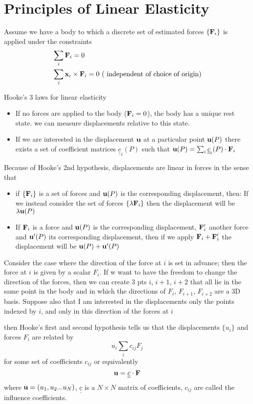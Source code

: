 \documentclass[12pt]{article}
\newcommand{\xx}{{\bf x}}
\newcommand{\uu}{{\bf u}}
\newcommand{\FF}{{\bf F}}
\newcommand{\cc}{{\underline{\underline c}}}
\begin{document}
\section{Principles of Linear Elasticity}
Assume we have a body to which a discrete set of estimated forces $\{\FF_i\}$ is applied under the constraints
\begin{align*}
&\sum_i \FF_i = 0 \\
&\sum_i \xx_i\times \FF_i = 0 \text{ ( independent of choice of origin)}
\end{align*}

Hooke's 3 laws for linear elasticity
\begin{itemize}
\item If no forces are applied to the body ($\FF_i = 0$), the body has a unique rest state.
we can measure displacements relative to this state.
\item If we are interested in the displacement $\uu$ at a particular point $\uu(P)$ there exists a set of coefficient matrices $\cc_i(P)$ such that  $\uu(P) = \sum_i \cc_i(P) \cdot \FF_i$
\end{itemize}


Because of Hooke's 2nd hypothesis, displacements are linear in forces in the sense that 
\begin{itemize}
\item if $\{\FF_i\}$ is a set of forces and $\uu(P)$ is the corresponding displacement, then: 
If we instead consider the set of forces $\{\lambda \FF_i\}$ then the displacement will be $\lambda \uu(P)$

\item If $\FF_i$ is a force and $\uu(P)$ is the corresponding displacement, $\FF_i'$ another force and $\uu'(P)$ its corresponding displacement, then if we apply $\FF_i + \FF_i'$ the displacement will be $\uu(P) +\uu'(P)$ 
\end{itemize}

Consider the case where the direction of the force at $i$ is set in advance; then the force at $i$ is given by a scalar $F_i$. If w want to have the freedom to change the direction of the forces, then we can create 3 pts $i$, $i+1$, $i+2$ that all lie in the same point in the body and in which the directions of $F_i$, $F_{i+1}$, $F_{i+2}$ are a 3D basis. Suppose also that I am interested in the displacements only the points indexed by $i$, and only in this direction of the forces at $i$

then Hooke's first and second hypothesis tells us that the displacements $\{u_i\}$
and forces $F_i$ are related by
\[
u_i
\sum_i c_{ij}F_j
\]
for some set of coefficients $c_{ij} $ or equivalently
\[
\uu = \cc\cdot\FF
\]
where $\uu = (u_1, u_2 ... u_N)$, $\cc$ is a $N\times N$ matrix of coefficients, $c_{ij}$ are called the influence coefficients.
\end{document}
